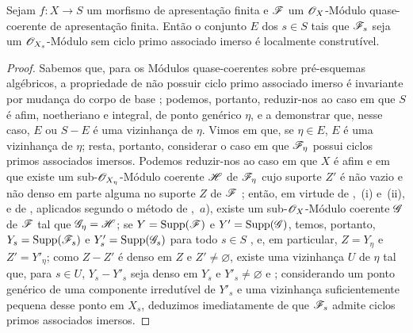 \begin{proposition}[9.8.1]
\label{IV.9.8.1}
Sejam $f:X\to S$ um morfismo de apresentação finita e $\mathscr{F}$ um $\mathscr{O}_X$-Módulo quase-coerente de apresentação finita.
Então o conjunto $E$ dos $s\in S$ tais que $\mathscr{F}_s$ seja um $\mathscr{O}_{X_s}$-Módulo sem ciclo primo associado imerso é localmente construtível.
\end{proposition}

\begin{proof}
\label{IV.9.8.1-proof}
Sabemos que, para os Módulos quase-coerentes sobre pré-esquemas algébricos, a propriedade de não possuir ciclo primo associado imerso é invariante por mudança do corpo de base ; podemos, portanto, reduzir-nos ao caso em que $S$ é afim, noetheriano e integral, de ponto genérico $\eta$, e a demonstrar que, nesse caso, $E$ ou $S-E$ é uma vizinhança de $\eta$.
Vimos em  que, se $\eta\in E$, $E$ é uma vizinhança de $\eta$; resta, portanto, considerar o caso em que $\mathscr{F}_\eta$ possui ciclos primos associados imersos.
Podemos reduzir-nos ao caso em que $X$ é afim e em que existe um sub-$\mathscr{O}_{X_\eta}$-Módulo coerente $\mathscr{H}$ de $\mathscr{F}_\eta$ cujo suporte $Z'$ é não vazio e não denso em parte alguma no suporte $Z$ de $\mathscr{F}$ ; então, em virtude de ,~(i) e~(ii),
e de , aplicados segundo o método de ,~$a$), existe um sub-$\mathscr{O}_X$-Módulo coerente $\mathscr{G}$ de $\mathscr{F}$ tal que $\mathscr{G}_\eta=\mathscr{H}$; se $Y=\operatorname{Supp}(\mathscr{F})$ e $Y'=\operatorname{Supp}(\mathscr{G})$, temos, portanto, $Y_s=\operatorname{Supp}(\mathscr{F}_s)$ e $Y'_s=\operatorname{Supp}(\mathscr{G}_s)$ para todo $s\in S$ , e, em particular, $Z=Y_\eta$ e $Z'=Y'_\eta$; como $Z-Z'$ é denso em $Z$ e $Z'\neq\varnothing$, existe uma vizinhança $U$ de $\eta$ tal que, para $s\in U$, $Y_s-Y'_s$ seja denso em $Y_s$ e $Y'_s\neq\varnothing$  e ; considerando um ponto genérico de uma componente irredutível de $Y'_s$ e uma vizinhança suficientemente pequena desse ponto em $X_s$, deduzimos imediatamente de  que $\mathscr{F}_s$ admite ciclos primos associados imersos.
\end{proof}

